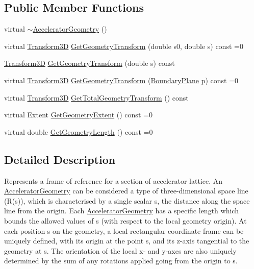 \subsection*{Public Member Functions}
\begin{DoxyCompactItemize}
\item 
virtual \hyperlink{classAcceleratorGeometry_aff2b5c1086ebcb68c68786e56d7db458}{$\sim$\+Accelerator\+Geometry} ()
\item 
virtual \hyperlink{classTransform3D}{Transform3D} \hyperlink{classAcceleratorGeometry_abf9c17cd1f84ac3e41973c85a65004de}{Get\+Geometry\+Transform} (double s0, double s) const =0
\item 
\hyperlink{classTransform3D}{Transform3D} \hyperlink{classAcceleratorGeometry_a47b2428c2a37fa828940ec35c20a956d}{Get\+Geometry\+Transform} (double s) const
\item 
virtual \hyperlink{classTransform3D}{Transform3D} \hyperlink{classAcceleratorGeometry_af26654f89c4bff1b516d2c6d6bb68871}{Get\+Geometry\+Transform} (\hyperlink{classAcceleratorGeometry_a5c1661938176102f235836f5a8be6034}{Boundary\+Plane} p) const =0
\item 
virtual \hyperlink{classTransform3D}{Transform3D} \hyperlink{classAcceleratorGeometry_a9bffb8262fc3b28195e1e25fbfb2b8ba}{Get\+Total\+Geometry\+Transform} () const
\item 
virtual Extent \hyperlink{classAcceleratorGeometry_a2db830fe927af3c9cba59b8452370bfb}{Get\+Geometry\+Extent} () const =0
\item 
virtual double \hyperlink{classAcceleratorGeometry_abc36f96d542e0d9db592f8e7ee455769}{Get\+Geometry\+Length} () const =0
\end{DoxyCompactItemize}


\subsection{Detailed Description}
Represents a frame of reference for a section of accelerator lattice. An \hyperlink{classAcceleratorGeometry}{Accelerator\+Geometry} can be considered a type of three-\/dimensional space line (R(s)), which is characterised by a single scalar s, the distance along the space line from the origin. Each \hyperlink{classAcceleratorGeometry}{Accelerator\+Geometry} has a specific length which bounds the allowed values of s (with respect to the local geometry origin). At each position s on the geometry, a local rectangular coordinate frame can be uniquely defined, with its origin at the point s, and its z-\/axis tangential to the geometry at s. The orientation of the local x-\/ and y-\/axes are also uniquely determined by the sum of any rotations applied going from the origin to s.

